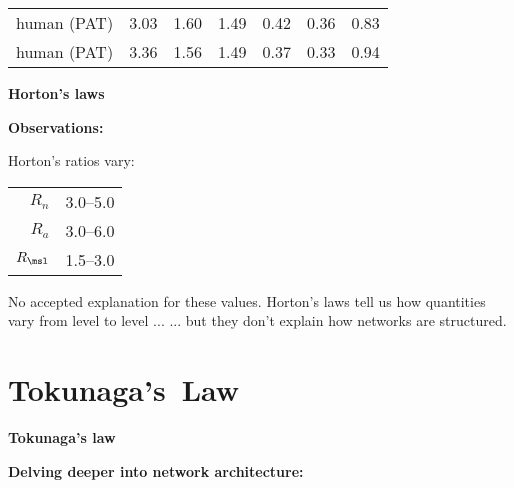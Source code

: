 \begin{frame}[label=]
\begin{frame}[label=]
\begin{frame}[label=]
\begin{frame}[label=]
\begin{frame}[label=]
\begin{frame}[label=]
\begin{frame}[label=]
\begin{frame}[label=]
\begin{frame}[label=]
\begin{frame}[label=]
\begin{frame}[label=]
\begin{frame}[label=]
\begin{frame}[label=]
\begin{frame}[label=]
\begin{columns}[b]
\begin{frame}[label=]
\begin{frame}[label=]
\begin{frame}[label=]
\begin{frame}[label=]
\begin{frame}[label=]
\begin{frame}[label=]
\begin{frame}[label=]
\begin{frame}[label=]
\begin{frame}[label=]
\begin{frame}[label=]
\begin{frame}[label=]
\begin{frame}[label=]
{\begin{center}
\begin{tabular}{c|ccc|cc|c}
      human (PAT)         & 3.03 & 1.60 & 1.49 & 0.42 & 0.36 & 0.83  \\
      human (PAT)         & 3.36 & 1.56 & 1.49 & 0.37 & 0.33 & 0.94  \\
    \end{tabular}
    \end{center}
    }


\begin{frame}[label=]
  \textbf{Horton's laws}

  \textbf{Observations:}
    
     Horton's ratios vary:
      \begin{center}
        \begin{tabular}{rl}
          $R_n$               & 3.0--5.0 \\
          $R_a$               & 3.0--6.0 \\
          $R_\msl$               & 1.5--3.0 \\
        \end{tabular}
      \end{center}
     No accepted explanation for these values.
     Horton's laws tell us how quantities vary
      from level to level ...
     ... but they don't explain how networks
      are structured.
    
  


\section{Tokunaga's\ Law}

\begin{frame}[label=]
  \textbf{Tokunaga's law}

  \textbf{Delving deeper into network architecture:}
    

\end{frame}
\end{frame}
\end{frame}
\end{frame}
\end{frame}
\end{frame}
\end{frame}
\end{frame}
\end{frame}
\end{frame}
\end{frame}
\end{frame}
\end{frame}
\end{frame}
\end{columns}
\end{frame}
\end{frame}
\end{frame}
\end{frame}
\end{frame}
\end{frame}
\end{frame}
\end{frame}
\end{frame}
\end{frame}
\end{frame}
\end{frame}
\end{frame}
\end{frame}
